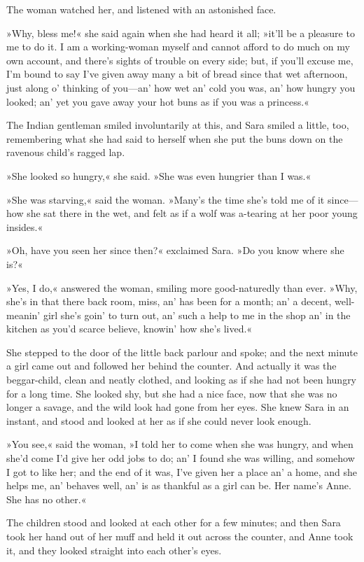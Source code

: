 The woman watched her, and listened with an astonished face.

»Why, bless me!« she said again when she had heard it all; »it'll be a pleasure to me to do it. I am a working-woman myself and cannot afford to do much on my own account, and there's sights of trouble on every side; but, if you'll excuse me, I'm bound to say I've given away many a bit of bread since that wet afternoon, just along o' thinking of you—an' how wet an' cold you was, an' how hungry you looked; an' yet you gave away your hot buns as if you was a princess.«

The Indian gentleman smiled involuntarily at this, and Sara smiled a little, too, remembering what she had said to herself when she put the buns down on the ravenous child's ragged lap.

»She looked so hungry,« she said. »She was even hungrier than I was.«

»She was starving,« said the woman. »Many's the time she's told me of it since—how she sat there in the wet, and felt as if a wolf was a-tearing at her poor young insides.«

»Oh, have you seen her since then?« exclaimed Sara. »Do you know where she is?«

»Yes, I do,« answered the woman, smiling more good-naturedly than ever. »Why, she's in that there back room, miss, an' has been for a month; an' a decent, well-meanin' girl she's goin' to turn out, an' such a help to me in the shop an' in the kitchen as you'd scarce believe, knowin' how she's lived.«

She stepped to the door of the little back parlour and spoke; and the next minute a girl came out and followed her behind the counter. And actually it was the beggar-child, clean and neatly clothed, and looking as if she had not been hungry for a long time. She looked shy, but she had a nice face, now that she was no longer a savage, and the wild look had gone from her eyes. She knew Sara in an instant, and stood and looked at her as if she could never look enough.

»You see,« said the woman, »I told her to come when she was hungry, and when she'd come I'd give her odd jobs to do; an' I found she was willing, and somehow I got to like her; and the end of it was, I've given her a place an' a home, and she helps me, an' behaves well, an' is as thankful as a girl can be. Her name's Anne. She has no other.«

The children stood and looked at each other for a few minutes; and then Sara took her hand out of her muff and held it out across the counter, and Anne took it, and they looked straight into each other's eyes.

